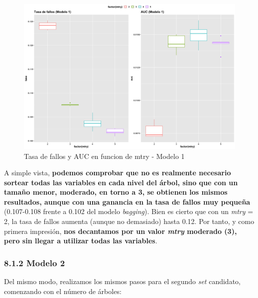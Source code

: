 \documentclass[
]{article}
\begin{document}
\begin{figure}[h!]

{\centering \includegraphics[width=0.99\linewidth,height=0.99\textheight,]{./charts/random_forest/04_comp_inicial_mtry_modelo1} 

}

\caption{Tasa de fallos y AUC en funcion de mtry - Modelo 1}\label{fig:unnamed-chunk-87}
\end{figure}

A simple vista, \textbf{podemos comprobar que no es realmente necesario
sortear todas las variables en cada nivel del árbol, sino que con un
tamaño menor, moderado, en torno a 3, se obtienen los mismos resultados,
aunque con una ganancia en la tasa de fallos muy pequeña} (0.107-0.108
frente a 0.102 del modelo \emph{bagging}). Bien es cierto que con un
\emph{mtry} = 2, la tasa de fallos aumenta (aunque no demasiado) hasta
0.12. Por tanto, y como primera impresión, \textbf{nos decantamos por un
valor \emph{mtry} moderado (3), pero sin llegar a utilizar todas las
variables}.

\hypertarget{modelo-2-1}{%
\subsubsection{8.1.2 Modelo 2}\label{modelo-2-1}}

Del mismo modo, realizamos los mismos pasos para el segundo \emph{set}
candidato, comenzando con el número de árboles:
\end{document}
